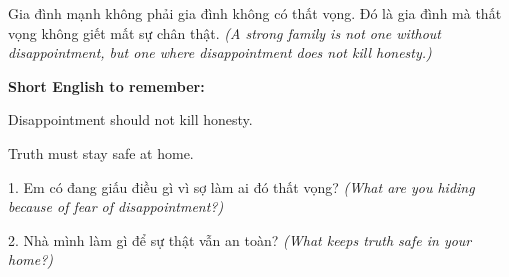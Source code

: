 \begin{baihoc}
Gia đình mạnh không phải gia đình không có thất vọng. Đó là gia đình mà thất vọng không giết mất sự chân thật.
\textit{(A strong family is not one without disappointment, but one where disappointment does not kill honesty.)}
\end{baihoc}

\begin{ghinhoanh}
\textbf{Short English to remember:}

Disappointment should not kill honesty.

Truth must stay safe at home.
\end{ghinhoanh}

\begin{tuhocnhanh}
1. Em có đang giấu điều gì vì sợ làm ai đó thất vọng? \textit{(What are you hiding because of fear of disappointment?)}

2. Nhà mình làm gì để sự thật vẫn an toàn? \textit{(What keeps truth safe in your home?)}
\end{tuhocnhanh}
\ngancach